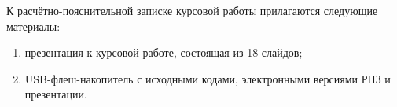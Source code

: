 
К расчётно-пояснительной записке курсовой работы прилагаются следующие материалы:
\begin{enumerate}
	\item презентация к курсовой работе, состоящая из 18 слайдов;
	\item USB-флеш-накопитель с исходными кодами, электронными версиями РПЗ и презентации.
\end{enumerate}